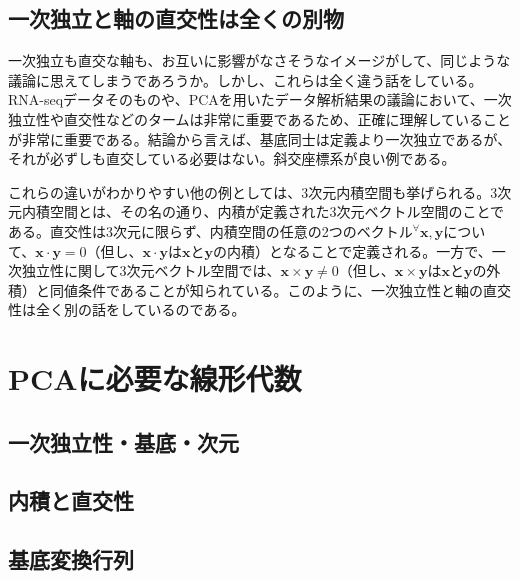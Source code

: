 \documentclass[10pt]{ujarticle}
\begin{document}
\subsection{一次独立と軸の直交性は全くの別物}
一次独立も直交な軸も、お互いに影響がなさそうなイメージがして、同じような議論に思えてしまうであろうか。しかし、これらは全く違う話をしている。RNA-seqデータそのものや、PCAを用いたデータ解析結果の議論において、一次独立性や直交性などのタームは非常に重要であるため、正確に理解していることが非常に重要である。結論から言えば、基底同士は定義より一次独立であるが、それが必ずしも直交している必要はない。斜交座標系が良い例である。

これらの違いがわかりやすい他の例としては、3次元内積空間も挙げられる。3次元内積空間とは、その名の通り、内積が定義された3次元ベクトル空間のことである。直交性は3次元に限らず、内積空間の任意の2つのベクトル$^\forall\mathbf{x,y}$について、$\mathbf{x}\cdot\mathbf{y}=0$（但し、$\mathbf{x}\cdot\mathbf{y}$は$\mathbf{x}$と$\mathbf{y}$の内積）となることで定義される。一方で、一次独立性に関して3次元ベクトル空間では、$\mathbf{x}\times\mathbf{y}\neq0$（但し、$\mathbf{x}\times\mathbf{y}$は$\mathbf{x}$と$\mathbf{y}$の外積）と同値条件であることが知られている。このように、一次独立性と軸の直交性は全く別の話をしているのである。

\section{PCAに必要な線形代数}

\hypertarget{bases_and_dim}{\subsection{一次独立性・基底・次元}}

\hypertarget{innerprod}{\subsection{内積と直交性}}

\subsection{基底変換行列}
\end{document}
